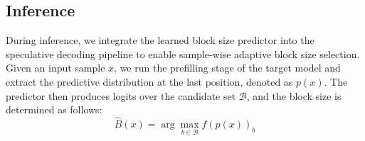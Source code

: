 \documentclass{article}
\begin{document}
\subsection{Inference}



\begin{table}
\vspace{-8pt}
\centering
\small
\setlength{\tabcolsep}{3.2pt} 
\renewcommand{\arraystretch}{1.15} 
\caption{Overhead analysis of the block size predictor compared to backbone models.}
\label{tab:model_efficiency}
\vspace{-8pt}
\end{table}
During inference, we integrate the learned block size predictor into the speculative decoding pipeline to enable sample-wise adaptive block size selection. Given an input sample $x$, we run the prefilling stage of the target model and extract the predictive distribution at the last position, denoted as $p(x)$. The predictor then produces logits over the candidate set $\mathcal{B}$, and the block size is determined as follows:
\begin{equation}
\hat{B}(x) = \arg\max_{b \in \mathcal{B}} f(p(x))_b
\end{equation}
\end{document}
